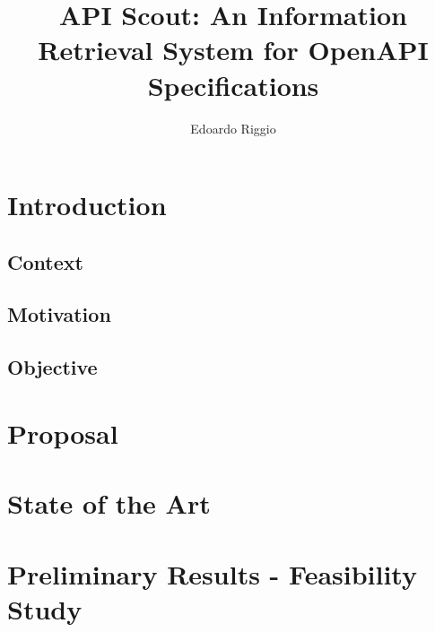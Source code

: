 \documentclass{layout/si-msc-proposal}
\author{Edoardo Riggio}
\title{API Scout: An Information Retrieval System for OpenAPI Specifications}
\begin{document}
    \maketitle


    \tableofcontents
    \listoffigures
    \listoftables
    \newpage


    \section{Introduction}\label{sec:introduction}

    \subsection{Context}\label{subsec:context}
    

    \subsection{Motivation}\label{subsec:motivation}
    

    \subsection{Objective}\label{subsec:objective}
    


    \section{Proposal}\label{sec:proposal}


    \section{State of the Art}\label{sec:state-of-the-art}


    \section{Preliminary Results - Feasibility Study}\label{sec:preliminary-results---feasibility-study}
\end{document}

